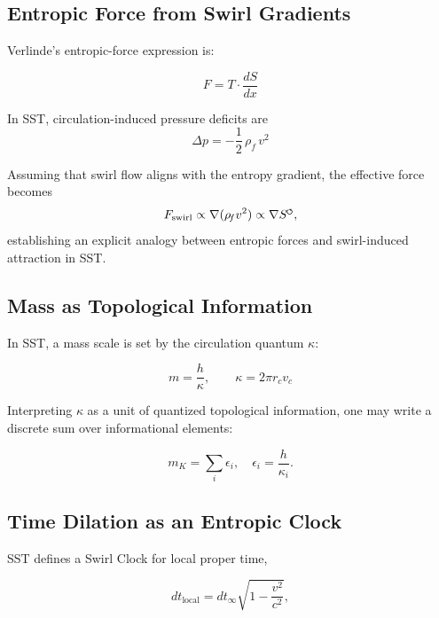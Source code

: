 \documentclass[reprint,aps,onecolumn,nofootinbib]{revtex4-2}
\newcommand{\swirlarrow}{%
    \mathchoice{\mkern-2mu\scriptstyle\boldsymbol{\circlearrowleft}}%
    {\mkern-2mu\scriptstyle\boldsymbol{\circlearrowleft}}%
    {\mkern-2mu\scriptscriptstyle\boldsymbol{\circlearrowleft}}%
    {\mkern-2mu\scriptscriptstyle\boldsymbol{\circlearrowleft}}%
}
\newcommand{\rhof}{\rho_{\!f}}                           %
\begin{document}
    \subsection{Entropic Force from Swirl Gradients}
        Verlinde’s entropic-force expression is:

        \begin{equation}
            F = T \cdot \frac{dS}{dx}
        \end{equation}

        In SST, circulation-induced pressure deficits are
        \begin{equation}
            \Delta p = -\frac{1}{2} \,\rhof\, v^2
        \end{equation}

        Assuming that swirl flow aligns with the entropy gradient, the effective force becomes
        \begin{equation}
            F_\text{swirl} \propto \nabla (\rhof v^2) \propto \nabla S^{\swirlarrow},
        \end{equation}
        establishing an explicit analogy between entropic forces and swirl-induced attraction in SST.

    \subsection{Mass as Topological Information}
        In SST, a mass scale is set by the circulation quantum $\kappa$:

        \begin{equation}
            m = \frac{h}{\kappa}, \qquad \kappa = 2\pi r_c v_c
        \end{equation}

        Interpreting $\kappa$ as a unit of quantized topological information, one may write a discrete sum over informational elements:

        \begin{equation}
            m_K = \sum_i \epsilon_i, \quad \epsilon_i = \frac{h}{\kappa_i}.
        \end{equation}

    \subsection{Time Dilation as an Entropic Clock}
        SST defines a Swirl Clock for local proper time,

        \begin{equation}
            dt_\text{local} = dt_\infty \sqrt{1 - \frac{v^2}{c^2}},
        \end{equation}
\end{document}
